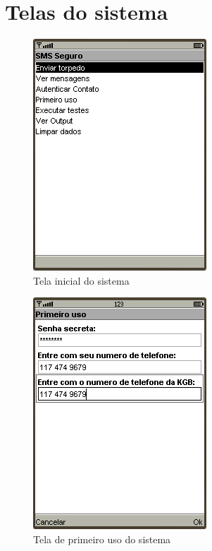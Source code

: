 \documentclass[a4paper,capchap,espacoduplo,normaltoc]{abntepusp}
\begin{document}
\chapter{Telas do sistema}\label{app:telas}
\begin{figure}[h]
	\centering
		\includegraphics{figuras/telainicial.PNG}
	\caption{Tela inicial do sistema}
\end{figure}

\begin{figure}[h]
	\centering
		\includegraphics{figuras/telaprimeirouso.PNG}
	\caption{Tela de primeiro uso do sistema}
\end{figure}
\end{document}
